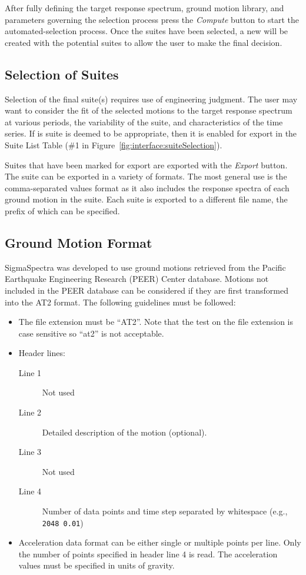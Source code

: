 \documentclass[11pt]{article}
\begin{document}
After fully defining the target response spectrum, ground motion library, and
parameters governing the selection process press the \emph{Compute} button to
start the automated-selection process. Once the suites have been selected, a new
will be created with the potential suites to allow the user to make the final
decision.

\subsection{Selection of Suites}

Selection of the final suite(s) requires use of engineering judgment. The user
may want to consider the fit of the selected motions to the target response
spectrum at various periods, the variability of the suite, and characteristics
of the time series. If is suite is deemed to be appropriate, then it is enabled
for export in the Suite List Table (\#1 in
Figure~\ref{fig:interface:suiteSelection}).

Suites that have been marked for export are exported with the \emph{Export}
button. The suite can be exported in a variety of formats. The most general use
is the comma-separated values format as it also includes the response spectra of
each ground motion in the suite. Each suite is exported to a different file
name, the prefix of which can be specified.



\subsection{Ground Motion Format}

SigmaSpectra was developed to use ground motions retrieved from the Pacific
Earthquake Engineering Research (PEER) Center database. Motions not included in
the PEER database can be considered if they are first transformed into the AT2
format. The following guidelines must be followed:
\begin{itemize}
    \item The file extension must be ``AT2''. Note that the test on the file
      extension is case sensitive so ``at2'' is not acceptable.
    \item Header lines:
      \begin{description}
        \item[Line 1] Not used
        \item[Line 2] Detailed description of the motion (optional).
        \item[Line 3] Not used
        \item[Line 4] Number of data points and time step separated by
          whitespace (e.g., \texttt{2048 0.01})
      \end{description}
    \item Acceleration data format can be either single or multiple points per
      line. Only the number of points specified in header line 4 is read. The
      acceleration values must be specified in units of gravity.
\end{itemize}
\end{document}
